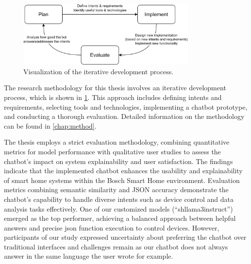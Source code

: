 \begin{figure}[b]
\centering
\includegraphics[width=0.8\textwidth]{graphics/iterative-design.png}
\caption{Visualization of the iterative development process.}
\label{fig:iterative-design}
\end{figure}
The research methodology for this thesis involves an iterative development process, which is shown in \cref{fig:iterative-design}. This approach includes defining intents and requirements, selecting tools and technologies, implementing a chatbot prototype, and conducting a thorough evaluation. Detailed information on the methodology can be found in \cref{chap:method}.

The thesis employs a strict evaluation methodology, combining quantitative metrics for model performance with qualitative user studies to assess the chatbot's impact on system explainability and user satisfaction.
The  findings indicate that the implemented chatbot enhances the usability and explainability of smart home systems within the Bosch Smart Home environment. Evaluation metrics combining semantic similarity and JSON accuracy demonstrate the chatbot's capability to handle diverse intents such as device control and data analysis tasks effectively. One of our customized models (``shllama3instruct'') emerged as the top performer, achieving a balanced approach between helpful answers and precise \gls{json} function execution to control devices.
However, participants of our study expressed uncertainty about preferring the chatbot over traditional interfaces and challenges remain as our chatbot does not always answer in the same language the user wrote for example.

